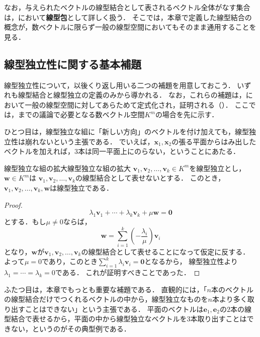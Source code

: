 なお，与えられたベクトルの線型結合として表されるベクトル全体がなす集合は，において\textbf{線型包}として詳しく扱う．
そこでは，本章で定義した線型結合の概念が，数ベクトルに限らず一般の線型空間においてもそのまま通用することを見る．

\subsection{線型独立性に関する基本補題}

線型独立性について，以後くり返し用いる二つの補題を用意しておこう．
いずれも線型結合と線型独立の定義のみから導かれる．
なお，これらの補題は，において一般の線型空間に対してあらためて定式化され，証明される（）．
ここでは，までの議論で必要となる数ベクトル空間$K^m$の場合を先に示す．

ひとつ目は，線型独立な組に「新しい方向」のベクトルを付け加えても，線型独立性は崩れないという主張である．
でいえば，$\bm{x}_1,\bm{x}_2$の張る平面からはみ出したベクトルを加えれば，$3$本は同一平面上にのらない，ということにあたる．

\begin{lemma}{線型独立な組の拡大}{線型独立な組の拡大}
  $\bm{v}_1, \bm{v}_2, \dots, \bm{v}_k \in K^m$を線型独立とし，$\bm{w} \in K^m$は
  $\bm{v}_1, \bm{v}_2, \dots, \bm{v}_k$の線型結合として表せないとする．
  このとき，$\bm{v}_1, \bm{v}_2, \dots, \bm{v}_k, \bm{w}$は線型独立である．
\end{lemma}

\begin{tleftbar}
\begin{proof}
  \[
    \lambda_1 \bm{v}_1 + \cdots + \lambda_k \bm{v}_k + \mu \bm{w} = \bm{0}
  \]
  とする．もし$\mu \ne 0$ならば，
  \[
    \bm{w} = \sum_{i=1}^{k} \left(-\frac{\lambda_i}{\mu}\right) \bm{v}_i
  \]
  となり，$\bm{w}$が$\bm{v}_1, \bm{v}_2, \dots, \bm{v}_k$の線型結合として表せることになって仮定に反する．
  よって$\mu = 0$であり，このとき$\sum_{i=1}^{k} \lambda_i \bm{v}_i = \bm{0}$となるから，
  線型独立性より$\lambda_1 = \cdots = \lambda_k = 0$である．
  これが証明すべきことであった．
\end{proof}
\end{tleftbar}

ふたつ目は，本章でもっとも重要な補題である．
直観的には，「$n$本のベクトルの線型結合だけでつくれるベクトルの中から，線型独立なものを$n$本より多く取り出すことはできない」という主張である．
平面のベクトルは$\bm{e}_1,\bm{e}_2$の$2$本の線型結合で表せるから，平面の中から線型独立なベクトルを$3$本取り出すことはできない，というのがその典型例である．

